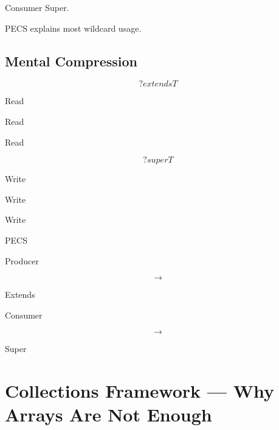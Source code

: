 \documentclass[11pt,a4paper]{book}
\begin{document}

\begin{rosettarule}

Consumer Super.

\end{rosettarule}


\begin{rosettarule}

PECS explains most wildcard usage.

\end{rosettarule}


\section{Mental Compression}

\[
? extends T
\]


Read

Read

Read


\[
? super T
\]


Write

Write

Write


PECS


Producer

\[
\rightarrow
\]

Extends


Consumer

\[
\rightarrow
\]

Super
\chapter{Collections Framework --- Why Arrays Are Not Enough}\label{chap:collections}
\end{document}
